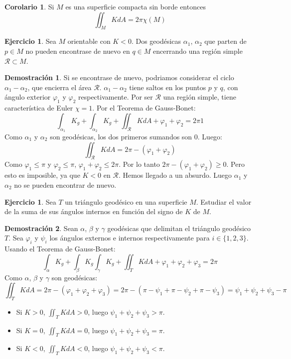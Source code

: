 \documentclass[twoside]{report}
\theoremstyle{definition}
\newtheorem{coro}[theorem]{Corolario}
\newtheorem{ejer}[theorem]{Ejercicio}
\newtheorem*{dem}{Demostración}
\numberwithin{equation}{section}
\begin{document}
\begin{coro}
Si $M$ es una superficie compacta sin borde entonces 
\[
\iint_M KdA=2\pi\chi(M)
\]
\end{coro}

\begin{ejer}
Sea $M$ orientable con $K < 0$. Dos geodésicas $α_1$, $α_2$ que parten de $p \in M$ no pueden encontrase de nuevo en $q \in M$ encerrando una región simple $\mathcal{R} \subset M$.
\end{ejer}

\begin{dem} Si se encontrase de nuevo, podriamos considerar el ciclo $α_1-α_2$, que encierra el área $\mathcal{R}$. $α_1-α_2$ tiene saltos en los puntos $p$ y $q$, con ángulo exterior $φ_1$ y $φ_2$ respectivamente. Por ser $\mathcal{R}$ una región simple, tiene característica de Euler $χ=1$. Por el Teorema de Gauss-Bonet:
\[ \int_{α_1} K_g + \int_{α_2} K_g + \iint_\mathcal{R} K dA + φ_1 + φ_2 = 2 \pi 1 \]
Como $α_1$ y $α_2$ son geodésicas, los dos primeros sumandos son $0$. Luego:
\[ \iint_\mathcal{R} K dA = 2\pi - (φ_1 + φ_2) \]
Como $φ_1 \leq \pi$ y $φ_2 \leq \pi$, $φ_1+φ_2 \leq 2\pi$. Por lo tanto $2\pi - (φ_1+φ_2) \geq 0$. Pero esto es imposible, ya que $K < 0$ en $\mathcal{R}$. Hemos llegado a un absurdo. Luego $α_1$ y $α_2$ no se pueden encontrar de nuevo.
\end{dem}

\begin{ejer} Sea $T$ un triángulo geodésico en una superficie $M$. Estudiar el valor de la suma de sus ángulos internos en función del signo de $K$ de $M$.
\end{ejer}

\begin{dem} Sean $α$, $β$ y $γ$ geodésicas que delimitan el triángulo geodésico $T$. Sea $φ_i$ y $ψ_i$ los ángulos externos e internos respectivamente para $i\in \{1,2,3\}$. Usando el Teorema de Gauss-Bonet:
\[ \int_α K_g + \int_β K_g  \int_γ K_g + \iint_T K dA + φ_1 + φ_2 + φ_3 = 2 \pi \]
Como $α$, $β$ y $γ$ son geodésicas:
\[ \iint_T K dA = 2\pi - (φ_1+φ_2+φ_3) = 2\pi - (π - ψ_1 + π - ψ_2 + π - ψ_3) = ψ_1 + ψ_2 + ψ_3 - π \]
\begin{itemize}
	\item Si $K > 0$, $\iint_T K dA > 0$, luego $ψ_1+ψ_2+ψ_3 > \pi$.
	\item Si $K = 0$, $\iint_T K dA = 0$, luego $ψ_1+ψ_2+ψ_3 = \pi$.
	\item Si $K < 0$, $\iint_T K dA < 0$, luego $ψ_1+ψ_2+ψ_3 < \pi$.
\end{itemize}
\end{dem}
\end{document}
